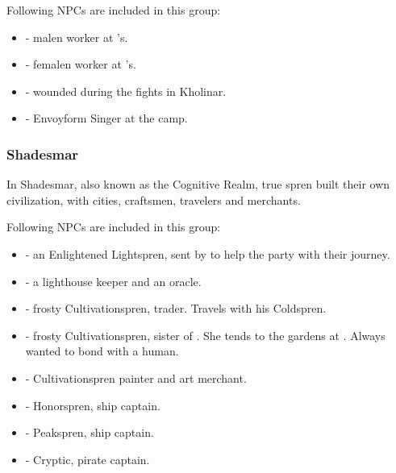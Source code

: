 Following NPCs are included in this group:

\begin{itemize}
	\item \npcSingerWorkerGranM[s]{} - malen worker at \npcGrandma{}'s.
	
	\item \npcSingerWorkerGranF[s]{} - femalen worker at \npcGrandma{}'s.
	
	\item \npcSingerWouned[s]{} - wounded during the fights in Kholinar.
	
	\item \npcSingerEnvoy[s]{} - Envoyform Singer at the camp.
\end{itemize}



\subsubsection{Shadesmar}

In Shadesmar, also known as the Cognitive Realm, true spren built their own civilization, with cities, craftsmen, travelers and merchants. 

Following NPCs are included in this group:

\begin{itemize}
	\item \npcSprenGuide[s]{} - an Enlightened Lightspren, sent by \npcSjaAnat{} to help the party with their journey.
	
	\item \npcFortuneReader[s]{} - a lighthouse keeper and an oracle.
	
	\item \npcIceCultivationsprenTrader[s]{} - frosty Cultivationspren, trader. Travels with his Coldspren.
	
	\item \npcIceCultivationsprenGardener[s]{} - frosty Cultivationspren, sister of \npcIceCultivationsprenTrader{}. She tends to the gardens at \locationFidelity{}. Always wanted to bond with a human.
	
	\item \npcCultivationsprenPainter[s]{} - Cultivationspren painter and art merchant.
	
	\item \npcHonorsprenCaptain[s]{} - Honorspren, ship captain.
	
	\item \npcPeaksprenCaptain[s]{} - Peakspren, ship captain.
	
	\item \npcCrypticCaptain[s]{} - Cryptic, pirate captain.
\end{itemize}




